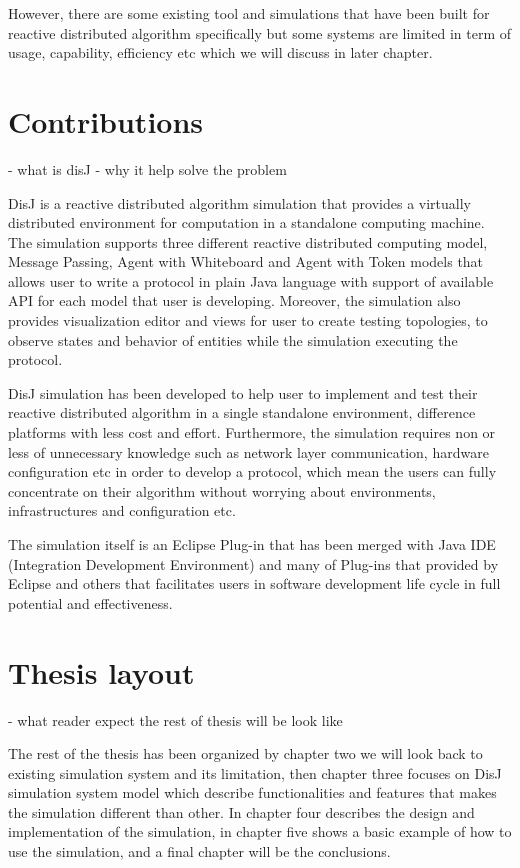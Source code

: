 However, there are some existing tool and simulations that have been built for reactive distributed algorithm specifically but some systems are limited in term of usage, capability, efficiency etc which we will discuss in later chapter.


\section{Contributions}
- what is disJ
- why it help solve the problem

DisJ is a reactive distributed algorithm simulation that provides a virtually distributed environment for computation in a standalone computing machine. The simulation supports three different reactive distributed computing model, Message Passing, Agent with Whiteboard and Agent with Token models that allows user to write a protocol in plain Java language with support of available API for each model that user is developing. Moreover, the simulation also provides visualization editor and views for user to create testing topologies, to observe states and behavior of entities while the simulation executing the protocol.

DisJ simulation has been developed to help user to implement and test their reactive distributed algorithm in a single standalone environment, difference platforms with less cost and effort. Furthermore, the simulation requires non or less of unnecessary knowledge such as network layer communication, hardware configuration etc in order to develop a protocol, which mean the users can fully concentrate on their algorithm without worrying about environments, infrastructures and configuration etc.

The simulation itself is an Eclipse Plug-in that has been merged with Java IDE (Integration Development Environment) and many of Plug-ins that provided by Eclipse and others that facilitates users in software development life cycle in full potential and effectiveness.


\section{Thesis layout}
- what reader expect the rest of thesis will be look like

The rest of the thesis has been organized by chapter two we will look back to existing simulation system and its limitation, then chapter three focuses on DisJ simulation system model which describe functionalities and features that makes the simulation different than other. In chapter four describes the design and implementation of the simulation, in chapter five shows a basic example of how to use the simulation, and a final chapter will be the conclusions.

